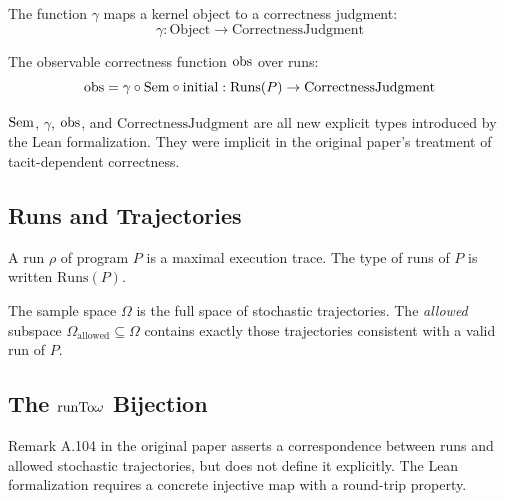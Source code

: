 \begin{definition}
The function $\gamma$ maps a kernel object to a correctness judgment:
\[
  \gamma : \mathrm{Object} \to \mathrm{CorrectnessJudgment}
\]
\end{definition}

\begin{definition}
The observable correctness function $\mathrm{obs}$ over runs:
\[
  \mathrm{obs} = \gamma \circ \mathrm{Sem} \circ \mathrm{initial}
       : \mathrm{Runs}(P) \to \mathrm{CorrectnessJudgment}
\]
\end{definition}

\begin{note}
$\mathrm{Sem}$, $\gamma$, $\mathrm{obs}$, and $\mathrm{CorrectnessJudgment}$ are all new
explicit types introduced by the Lean formalization. They were implicit in the
original paper's treatment of tacit-dependent correctness.
\end{note}

\subsection{Runs and Trajectories}

\begin{definition}[Run]
A run $\rho$ of program $P$ is a maximal execution trace. The type of runs of
$P$ is written $\mathrm{Runs}(P)$.
\end{definition}

\begin{definition}
The sample space $\Omega$ is the full space of stochastic trajectories. The
\emph{allowed} subspace $\Omega_{\mathrm{allowed}} \subseteq \Omega$ contains
exactly those trajectories consistent with a valid run of $P$.
\end{definition}

\subsection{The \texorpdfstring{$\mathrm{runTo}\omega$}{runToOmega} Bijection}

\begin{correction}
Remark A.104 in the original paper asserts a correspondence between runs and
allowed stochastic trajectories, but does not define it explicitly. The Lean
formalization requires a concrete injective map with a round-trip property.
\end{correction}

